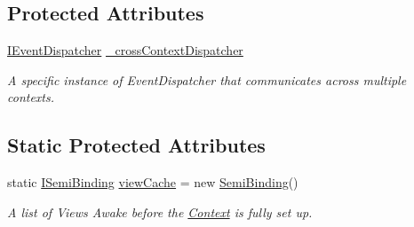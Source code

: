 \subsection*{Protected Attributes}
\begin{DoxyCompactItemize}
\item 
\hyperlink{interfacestrange_1_1extensions_1_1dispatcher_1_1eventdispatcher_1_1api_1_1_i_event_dispatcher}{I\-Event\-Dispatcher} \hyperlink{classstrange_1_1extensions_1_1context_1_1impl_1_1_m_v_c_s_context_a55fc4efce14c8f9021cba2e25851942b}{\-\_\-cross\-Context\-Dispatcher}
\begin{DoxyCompactList}\small\item\em A specific instance of Event\-Dispatcher that communicates across multiple contexts. \end{DoxyCompactList}\end{DoxyCompactItemize}
\subsection*{Static Protected Attributes}
\begin{DoxyCompactItemize}
\item 
\hypertarget{classstrange_1_1extensions_1_1context_1_1impl_1_1_m_v_c_s_context_aaf84156c76178568b5d1f53159855dd3}{static \hyperlink{interfacestrange_1_1framework_1_1api_1_1_i_semi_binding}{I\-Semi\-Binding} \hyperlink{classstrange_1_1extensions_1_1context_1_1impl_1_1_m_v_c_s_context_aaf84156c76178568b5d1f53159855dd3}{view\-Cache} = new \hyperlink{classstrange_1_1framework_1_1impl_1_1_semi_binding}{Semi\-Binding}()}\label{classstrange_1_1extensions_1_1context_1_1impl_1_1_m_v_c_s_context_aaf84156c76178568b5d1f53159855dd3}

\begin{DoxyCompactList}\small\item\em A list of Views Awake before the \hyperlink{classstrange_1_1extensions_1_1context_1_1impl_1_1_context}{Context} is fully set up. \end{DoxyCompactList}\end{DoxyCompactItemize}
